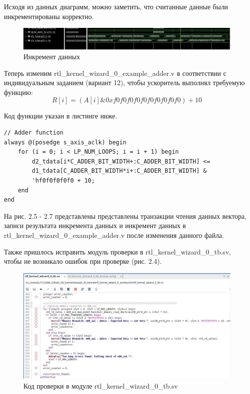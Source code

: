 Исходя из данных диаграмм, можно заметить, что считанные данные были инкрементированы корректно.

\begin{figure}[H]
	\begin{center}
		\includegraphics[scale=0.5]{assets/inc_def.png}
	\end{center}
	\caption{Инкремент данных}
\end{figure}

Теперь изменим rtl\_kernel\_wizard\_0\_example\_adder.v в соответствии с индивидуальным заданием (вариант 12), чтобы ускоритель выполнял требуемую функцию:
\begin{equation}
	R[i] = (A[i] \& 0xf0f0f0f0f0f0f0f0f0f0) + 10
\end{equation}

Код функции указан в листинге ниже.

\begin{lstlisting}[label=code, caption=Код инкремента данных]
// Adder function
always @(posedge s_axis_aclk) begin
	for (i = 0; i < LP_NUM_LOOPS; i = i + 1) begin
		d2_tdata[i*C_ADDER_BIT_WIDTH+:C_ADDER_BIT_WIDTH] <=
		d1_tdata[C_ADDER_BIT_WIDTH*i+:C_ADDER_BIT_WIDTH] &
		'hf0f0f0f0f0 + 10;
	end
end
\end{lstlisting}
\captionsetup{singlelinecheck = false, justification=centering}

На рис. 2.5 - 2.7 представлены представлены транзакции чтения данных вектора, записи результата инкремента данных и инкремент данных в rtl\_kernel\_wizard\_0\_example\_adder.v после изменения данного файла.

Также пришлось исправить модуль проверки в rtl\_kernel\_wizard\_0\_tb.sv, чтобы не возникало ошибок при проверке (рис. 2.4).

\begin{figure}[H]
	\begin{center}
		\includegraphics[scale=0.5]{assets/tb_fixed.png}
	\end{center}
	\caption{Код проверки в модуле rtl\_kernel\_wizard\_0\_tb.sv}
\end{figure}

